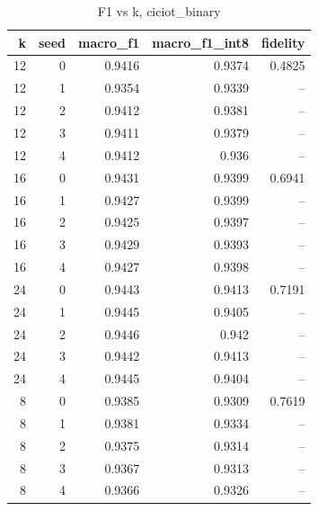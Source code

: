 \begin{table}
\caption{F1 vs k, ciciot_binary}
\begin{tabular}{rrrrr}
\toprule
k & seed & macro_f1 & macro_f1_int8 & fidelity \\
\midrule
12 & 0 & 0.9416 & 0.9374 & 0.4825 \\
12 & 1 & 0.9354 & 0.9339 & -- \\
12 & 2 & 0.9412 & 0.9381 & -- \\
12 & 3 & 0.9411 & 0.9379 & -- \\
12 & 4 & 0.9412 & 0.936 & -- \\
16 & 0 & 0.9431 & 0.9399 & 0.6941 \\
16 & 1 & 0.9427 & 0.9399 & -- \\
16 & 2 & 0.9425 & 0.9397 & -- \\
16 & 3 & 0.9429 & 0.9393 & -- \\
16 & 4 & 0.9427 & 0.9398 & -- \\
24 & 0 & 0.9443 & 0.9413 & 0.7191 \\
24 & 1 & 0.9445 & 0.9405 & -- \\
24 & 2 & 0.9446 & 0.942 & -- \\
24 & 3 & 0.9442 & 0.9413 & -- \\
24 & 4 & 0.9445 & 0.9404 & -- \\
8 & 0 & 0.9385 & 0.9309 & 0.7619 \\
8 & 1 & 0.9381 & 0.9334 & -- \\
8 & 2 & 0.9375 & 0.9314 & -- \\
8 & 3 & 0.9367 & 0.9313 & -- \\
8 & 4 & 0.9366 & 0.9326 & -- \\
\bottomrule
\end{tabular}
\end{table}
